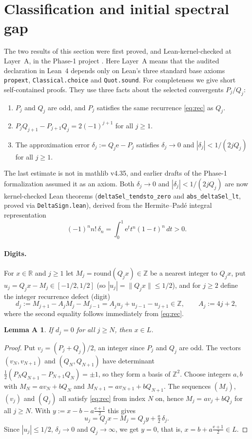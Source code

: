\documentclass[11pt]{article}
\newtheorem*{lemmaA}{Lemma A}
\theoremstyle{definition}
\theoremstyle{remark}
\newcommand{\R}{\mathbb{R}}
\newcommand{\Z}{\mathbb{Z}}
\newcommand{\ee}{\mathrm{e}}
\begin{document}
\section{Classification and initial spectral gap}\label{sec:class}

The two results of this section were first proved, and Lean-kernel-checked at
Layer~A, in the Phase-1 project \cite{Phase1}. Here Layer~A means that the
audited declaration in Lean~4 depends only on Lean's three standard base axioms
\texttt{propext}, \texttt{Classical.choice} and \texttt{Quot.sound}. For
completeness we give short self-contained proofs. They use three facts about the
selected convergents $P_j/Q_j$:
\begin{enumerate}[label=(\arabic*),leftmargin=2em]
\item $P_j$ and $Q_j$ are odd, and $P_j$ satisfies the same recurrence
\eqref{eq:rec} as $Q_j$.
\item $P_jQ_{j+1}-P_{j+1}Q_j=2(-1)^{j+1}$ for all $j\ge1$.
\item The approximation error $\delta_j:=Q_j\ee-P_j$ satisfies $\delta_j\to0$
and $|\delta_j|<1/(2jQ_j)$ for all $j\ge1$.
\end{enumerate}
The last estimate is not in mathlib v4.35, and earlier drafts of the Phase-1
formalization assumed it as an axiom. Both $\delta_j\to0$ and
$|\delta_j|<1/(2jQ_j)$ are now kernel-checked Lean theorems
(\texttt{deltaSel\_tendsto\_zero} and \texttt{abs\_deltaSel\_lt}, proved via
\texttt{DeltaSign.lean}), derived from the Hermite--Pad\'e integral
representation
\[
(-1)^n n!\,\delta_n=\int_0^1 \ee^t t^n(1-t)^n\,dt>0.
\]

\paragraph{Digits.} For $x\in\R$ and $j\ge1$ let $M_j=\mathrm{round}(Q_jx)\in\Z$
be a nearest integer to $Q_jx$, put $u_j=Q_jx-M_j\in[-1/2,1/2]$ (so
$|u_j|=\|Q_jx\|\le1/2$), and for $j\ge2$ define the integer recurrence defect
(digit)
\begin{equation}\label{eq:defect-id}
 d_j:=M_{j+1}-A_jM_j-M_{j-1}=A_ju_j+u_{j-1}-u_{j+1}\in\Z,\qquad A_j:=4j+2,
\end{equation}
where the second equality follows immediately from \eqref{eq:rec}.

\begin{lemmaA}
If $d_j=0$ for all $j\ge N$, then $x\in L$.
\end{lemmaA}

\begin{proof}
Put $v_j=(P_j+Q_j)/2$, an integer since $P_j$ and $Q_j$ are odd. The
vectors $(v_N,v_{N+1})$ and $(Q_N,Q_{N+1})$ have determinant
$\tfrac12(P_NQ_{N+1}-P_{N+1}Q_N)=\pm1$, so they form a basis of $\Z^2$.
Choose integers $a,b$ with $M_N=av_N+bQ_N$ and $M_{N+1}=av_{N+1}+bQ_{N+1}$.
The sequences $(M_j)$, $(v_j)$ and $(Q_j)$ all satisfy \eqref{eq:rec}
from index $N$ on, hence $M_j=av_j+bQ_j$ for all $j\ge N$. With
$y:=x-b-a\frac{\ee+1}{2}$ this gives
\[
 u_j=Q_jx-M_j=Q_jy+\tfrac a2\,\delta_j .
\]
Since $|u_j|\le1/2$, $\delta_j\to0$ and $Q_j\to\infty$, we get $y=0$, that
is, $x=b+a\frac{\ee+1}{2}\in L$.
\end{proof}
\end{document}
